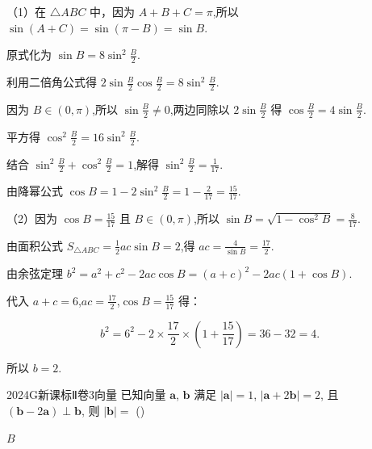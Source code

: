 \documentclass[12pt,UTF-8,a4paper]{ctexart}
\numberwithin{figure}{section}
\theoremstyle{mystyle}
\theoremstyle{mystylekaishu}
\theoremstyle{mystyle}
\numberwithin{xiti}{section}
\begin{document}
\begin{solutions}
（1）在 $\triangle ABC$ 中，因为 $A+B+C=\pi$,所以 $\sin(A+C)=\sin(\pi-B)=\sin B$.

原式化为 $\sin B=8\sin^2\frac{B}{2}$.

利用二倍角公式得 $2\sin\frac{B}{2}\cos\frac{B}{2}=8\sin^2\frac{B}{2}$.

因为 $B\in(0,\pi)$,所以 $\sin\frac{B}{2}\neq 0$,两边同除以 $2\sin\frac{B}{2}$ 得 $\cos\frac{B}{2}=4\sin\frac{B}{2}$.

平方得 $\cos^2\frac{B}{2}=16\sin^2\frac{B}{2}$.

结合 $\sin^2\frac{B}{2}+\cos^2\frac{B}{2}=1$,解得 $\sin^2\frac{B}{2}=\displaystyle\frac{1}{17}$.

由降幂公式 $\cos B=1-2\sin^2\frac{B}{2}=1-\displaystyle\frac{2}{17}=\displaystyle\frac{15}{17}$.

（2）因为 $\cos B=\displaystyle\frac{15}{17}$ 且 $B\in(0,\pi)$,所以 $\sin B=\sqrt{1-\cos^2 B}=\displaystyle\frac{8}{17}$.

由面积公式 $S_{\triangle ABC}=\displaystyle\frac{1}{2}ac\sin B=2$,得 $ac=\displaystyle\frac{4}{\sin B}=\displaystyle\frac{17}{2}$.

由余弦定理 $b^2=a^2+c^2-2ac\cos B=(a+c)^2-2ac(1+\cos B)$.

代入 $a+c=6$,$ac=\displaystyle\frac{17}{2}$,$\cos B=\displaystyle\frac{15}{17}$ 得：

$$
b^2=6^2-2\times\displaystyle\frac{17}{2}\times\left(1+\displaystyle\frac{15}{17}\right)=36-32=4.
$$

所以 $b=\boxed{2}$.
\end{solutions}


\begin{problem}{2024}{G}{新课标Ⅱ卷}{3}{向量}
已知向量 $\boldsymbol{a}$, $\boldsymbol{b}$ 满足 $|\boldsymbol{a}|=1$, $|\boldsymbol{a}+2\boldsymbol{b}|=2$, 且 $(\boldsymbol{b}-2\boldsymbol{a}) \perp \boldsymbol{b}$, 则 $|\boldsymbol{b}|=$ (\hspace{1cm})
\begin{choices}
\end{choices}
\end{problem}

\begin{answer}
$B$
\end{answer}
\end{document}
